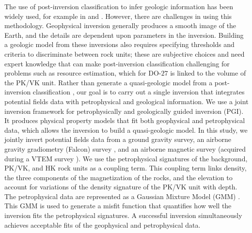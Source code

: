 \documentclass[paper, twocolumn]{geophysics} %
\begin{document}
The use of post-inversion classification to infer geologic information has been widely used, for example in \citet{OldenburgMilligan1997,PostInversionClustering1,PostInversionClustering0,PostInversionClustering2,PostInversionClustering3} and \citet{Melo2017}. However, there are challenges in using this methodology. Geophysical inversion generally produces a smooth image of the Earth, and the details are dependent upon parameters in the inversion. Building a geologic model from these inversions also requires specifying thresholds and criteria to discriminate between rock units; these are subjective choices and need expert knowledge that can make post-inversion classification challenging for problems such as resource estimation, which for DO-$27$ is linked to the volume of the PK/VK unit. Rather than generate a quasi-geologic model from a post-inversion classification \citep{QuasiGeologicalModel}, our goal is to carry out a single inversion that integrates potential fields data with petrophysical and geological information. We use a joint inversion framework \citep{ggz389,AsticJoint} for petrophysically and geologically guided inversion (PGI). It produces physical property models that fit both geophysical and petrophysical data, which allows the inversion to build a quasi-geologic model. In this study, we jointly invert potential fields data from a ground gravity survey, an airborne gravity gradiometry (Falcon) survey \citep{FalconPaper}, and an airborne magnetic survey (acquired during a VTEM survey \citep{VTEM}). We use the petrophysical signatures of the background, PK/VK, and HK rock units as a coupling term. This coupling term links density, the three components of the magnetization of the rocks, and the elevation to account for variations of the density signature of the PK/VK unit with depth. The petrophysical data are represented as a Gaussian Mixture Model (GMM) \citep{ExpectationMaximization, Murphy2012}. This GMM is used to generate a misfit function that quantifies how well the inversion fits the petrophysical signatures. A successful inversion simultaneously achieves acceptable fits of the geophysical and petrophysical data.
\end{document}
